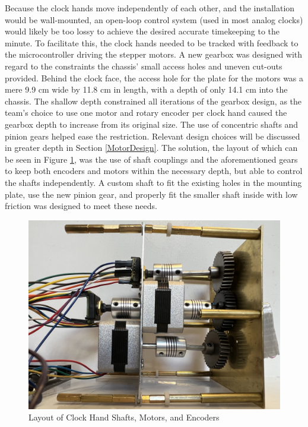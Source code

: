 \documentclass[11pt]{article}
\begin{document}
Because the clock hands move independently of each other, and the installation would be wall-mounted, an open-loop control system (used in most analog clocks) would likely be too lossy to achieve the desired accurate timekeeping to the minute. 
To facilitate this, the clock hands needed to be tracked with feedback to the microcontroller driving the stepper motors.
A new gearbox was designed with regard to the constraints the chassis' small access holes and uneven cut-outs provided. 
Behind the clock face, the access hole for the plate for the motors was a mere 9.9 cm wide by 11.8 cm in length, with a depth of only 14.1 cm into the chassis. 
The shallow depth constrained all iterations of the gearbox design, as the team's choice to use one motor and rotary encoder per clock hand caused the gearbox depth to increase from its original size. 
The use of concentric shafts and pinion gears helped ease the restriction.
Relevant design choices will be discussed in greater depth in Section \ref{MotorDesign}.
The solution, the layout of which can be seen in Figure \ref{MotorLayout}, was the use of shaft couplings and the aforementioned gears to keep both encoders and motors within the necessary depth, but able to control the shafts independently. 
A custom shaft to fit the existing holes in the mounting plate, use the new pinion gear, and properly fit the smaller shaft inside with low friction was designed to meet these needs. 

\begin{figure}[H]
\centering
\includegraphics[width=4.5in]{motors.jpg}
\caption{Layout of Clock Hand Shafts, Motors, and Encoders}
\label{MotorLayout}
\end{figure}
\end{document}
